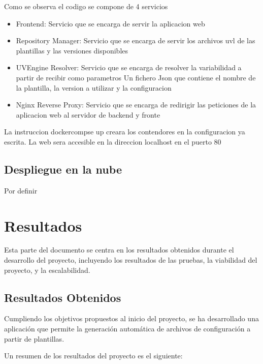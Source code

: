 \documentclass[12pt, a4paper, twoside]{article}
\begin{document}
Como se observa el codigo se compone de 4 servicios 
\begin{itemize}
	\item Frontend: Servicio que se encarga de servir la aplicacion web
	\item Repository Manager: Servicio que se encarga de servir los archivos uvl de las plantillas y las versiones disponibles
	\item UVEngine Resolver: Servicio que se encarga de resolver la variabilidad a partir de recibir como parametros Un fichero Json que contiene el nombre de la plantilla, la version a utilizar y la configuracion 
	\item Nginx Reverse Proxy: Servicio que se encarga de redirigir las peticiones de la aplicacion web al servidor de backend y fronte	
\end{itemize}

La instruccion dockercompse up creara los contendores en la configuracion ya escrita. La web sera accesible en la direccion localhost en el puerto 80

\subsection{ Despliegue en la nube }
Por definir 





\section{Resultados}
\label{sec:Resultados}
Esta parte del documento se centra en los resultados obtenidos durante el desarrollo del proyecto, incluyendo los resultados de las pruebas, la viabilidad del proyecto, y la escalabilidad.
\subsection{Resultados Obtenidos}
Cumpliendo los objetivos propuestos al inicio del proyecto, se ha desarrollado una aplicación que permite la generación automática de archivos de configuración a partir de plantillas.

Un resumen de los resultados del proyecto es el siguiente:
\end{document}
